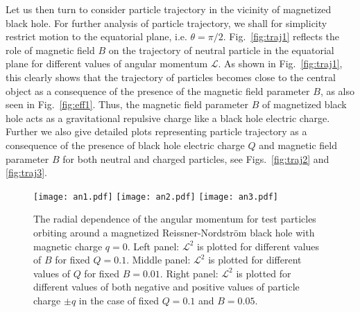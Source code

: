 \documentclass[showpacs,twocolumn,superscriptaddress]{revtex4}
\begin{document}
Let us then turn to consider particle trajectory in the vicinity of magnetized black hole. For further analysis of particle trajectory, we shall for simplicity restrict motion to the equatorial plane, i.e. $\theta=\pi/2$. Fig.~\ref{fig:traj1} reflects the role of magnetic field $B$ on the trajectory of neutral particle in the equatorial plane for different values of angular momentum $\mathcal{L}$. As shown in Fig.~\ref{fig:traj1}, this clearly shows that the trajectory of particles becomes close to the central object as a consequence of the presence of the magnetic field parameter $B$, as also seen in Fig.~\ref{fig:eff1}. Thus, the magnetic field parameter $B$ of magnetized black hole acts as a gravitational repulsive charge like a black hole electric charge. Further we also give detailed plots representing particle trajectory as a consequence of the presence of black hole electric charge $Q$ and magnetic field parameter $B$ for both neutral and charged particles, see Figs.~\ref{fig:traj2} and \ref{fig:traj3}.   
%
\begin{figure*}

  \texttt{[image: an1.pdf]}%
  \texttt{[image: an2.pdf]}
  \texttt{[image: an3.pdf]}
%
\caption{\label{fig:ang} The radial dependence of the angular momentum for test particles orbiting around a magnetized Reissner-Nordstr\"{o}m black hole with magnetic charge $q=0$. Left panel:  ${\mathcal L}^2$ is plotted for different values of $B$ for fixed $Q=0.1$. Middle panel: ${\mathcal L}^2$ is plotted for different values of $Q$ for fixed $B=0.01$. Right panel: ${\mathcal L}^2$ is plotted for different values of both negative and positive values of particle charge $\pm q$ in the case of fixed $Q=0.1$ and $B=0.05$. }
\end{figure*}
%
%
\end{document}
